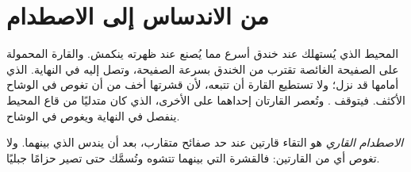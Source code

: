 \section{من الاندساس إلى الاصطدام}

المحيط الذي يُستهلك عند خندق أسرع مما يُصنع عند ظهرته
ينكمش. والقارة المحمولة على الصفيحة الغائصة تقترب من الخندق
بسرعة الصفيحة، وتصل إليه في النهاية.  الذي أمامها قد نزل؛ ولا تستطيع القارة أن تتبعه،
لأن قشرتها أخف من أن تغوص في الوشاح الأكثف. فيتوقف
. وتُعصر القارتان إحداهما على الأخرى، 
الذي كان متدليًا من قاع المحيط ينفصل في النهاية ويغوص في
الوشاح.

\begin{definition}\label{def:g12:mountain-building:collision}
\emph{الاصطدام القاري} هو التقاء
قارتين عند حد صفائح متقارب، بعد أن يندس 
الذي بينهما. ولا تغوص أي من القارتين: فالقشرة التي بينهما
تتشوه وتُسمَّك حتى تصير حزامًا جبليًا.
\end{definition}

